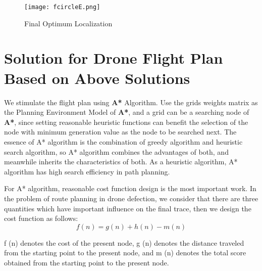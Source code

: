 \documentclass{mcmthesis}
\begin{document}
    \begin{figure}[H]                                         
   	\centering
   	\texttt{[image: fcircleE.png]}        
   	\caption{Final Optimum Localization}                          
   	\label{finallocation}                                          
   \end{figure}
     
      \section{Solution for Drone Flight Plan Based on Above Solutions  }

We stimulate the flight plan using \textbf{A*} Algorithm. Use the grids weights matrix as the Planning Environment Model of \textbf{A*}, and a grid can be a searching node of \textbf{A*}, since setting reasonable heuristic functions can benefit the selection of the node with minimum generation value as the node to be searched next. The essence of A* algorithm is the combination of greedy algorithm and heuristic search algorithm, so A* algorithm combines the advantages of both, and meanwhile inherits the characteristics of both. As a heuristic algorithm, A* algorithm has high search efficiency in path planning.  \par 
For A* algorithm, reasonable cost function design is the most important work. In the problem of route planning in drone defection, we consider that there are three quantities which have important influence on the final trace, then we design the cost function as follows: 
\begin{equation}
f(n)=g(n)+h(n)-m(n)
\end{equation}

 f (n) denotes the cost of the present node, g (n) denotes the distance traveled from the starting point to the present node, and m (n) denotes the total score obtained from the starting point to the present node. \par
 
\end{document}
